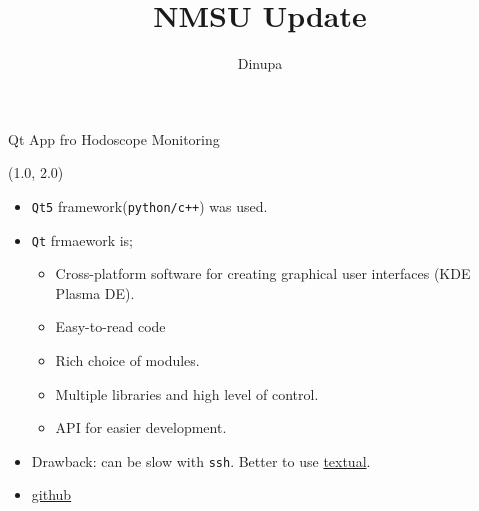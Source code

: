 \documentclass[10pt, xcolor={dvipsnames}, aspectratio = 169]{beamer}
\title{NMSU Update}
\author{Dinupa}
\begin{document}
	\begin{frame}
		\maketitle
	\end{frame}

	\begin{frame}[fragile]{Qt App fro Hodoscope Monitoring}
		\begin{textblock}{14.0}(1.0, 2.0)
			\begin{itemize}
				\item \verb|Qt5| framework(\verb|python/c++|) was used.
				\item \verb|Qt| frmaework is;
				\begin{itemize}
					\item Cross-platform software for creating graphical user interfaces (KDE Plasma DE).
					\item Easy-to-read code
					\item Rich choice of modules.
					\item Multiple libraries and high level of control.
					\item API for easier development.
				\end{itemize}
				\item Drawback: can be slow with \verb|ssh|. Better to use \href{https://github.com/Textualize/textual}{textual}.
				\item \href{https://github.com/dinupa1/hodomon}{github}
			\end{itemize}
		\end{textblock}
	\end{frame}
\end{document}
